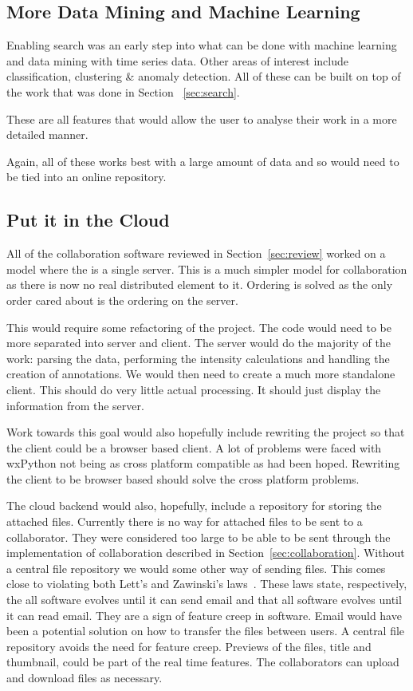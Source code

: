 \subsection{More Data Mining and Machine Learning}

Enabling search was an early step into what can be done with machine learning and data mining with time series data.  Other areas of interest include classification, clustering \& anomaly detection.  All of these can be built on top of the work that was done in Section ~\ref{sec:search}.

These are all features that would allow the user to analyse their work in a more detailed manner.

Again, all of these works best with a large amount of data and so would need to be tied into an online repository.

\subsection{Put it in the Cloud}
\label{sec:cloud}
All of the collaboration software reviewed in Section~\ref{sec:review} worked on a model where the is a single server.  This is a much simpler model for collaboration as there is now no real distributed element to it.  Ordering is solved as the only order cared about is the ordering on the server.

This would require some refactoring of the project.  The code would need to be more separated into server and client.  The server would do the majority of the work: parsing the data, performing the intensity calculations and handling the creation of annotations.  We would then need to create a much more standalone client.  This should do very little actual processing.  It should just display the information from the server.

Work towards this goal would also hopefully include rewriting the project so that the client could be a browser based client.  A lot of problems were faced with wxPython not being as cross platform compatible as had been hoped.  Rewriting the client to be browser based should solve the cross platform problems.

The cloud backend would also, hopefully, include a repository for storing the attached files.  Currently there is no way for attached files to be sent to a collaborator.  They were considered too large to be able to be sent through the implementation of collaboration described in Section~\ref{sec:collaboration}.  Without a central file repository we would some other way of sending files.  This comes close to violating both Lett's and Zawinski's laws~\cite{atwoord}.  These laws state, respectively, the all software evolves until it can send email and that all software evolves until it can read email.  They are a sign of feature creep in software.  Email would have been a potential solution on how to transfer the files between users.  A central file repository avoids the need for feature creep.  Previews of the files, title and thumbnail, could be part of the real time features.  The collaborators can upload and download files as necessary.

